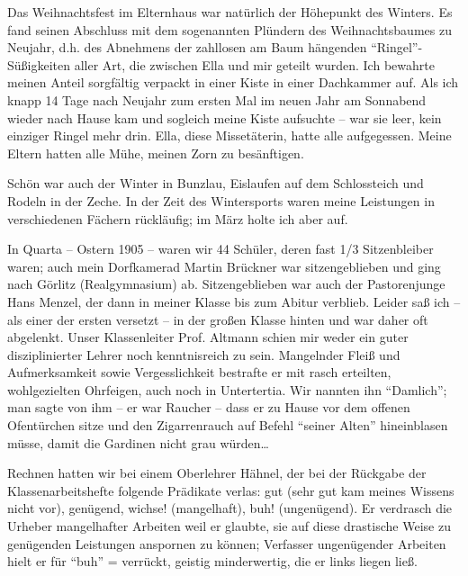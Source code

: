 \documentclass[a5paper,pagesize,10pt,twoside=true]{scrbook}
\renewcommand{\marginpar}[2][]{}
\begin{document}
Das Weihnachtsfest im Elternhaus war natürlich der Höhepunkt des Winters. Es fand seinen Abschluss mit dem sogenannten Plündern des Weihnachtsbaumes zu Neujahr, d.h. des Abnehmens der zahllosen am Baum hängenden \enquote{Ringel}-Süßigkeiten aller Art, die zwischen Ella und mir geteilt wurden. Ich bewahrte meinen Anteil sorgfältig verpackt in einer Kiste in einer Dachkammer auf. Als ich knapp 14 Tage nach Neujahr zum ersten Mal im neuen Jahr am Sonnabend wieder nach Hause kam und sogleich meine Kiste aufsuchte -- war sie leer, kein einziger Ringel mehr drin. Ella, diese Missetäterin, hatte alle aufgegessen. Meine Eltern hatten alle Mühe, meinen Zorn zu besänftigen.

Schön war auch der Winter in Bunzlau, Eislaufen auf dem Schlossteich und Rodeln in der Zeche. In der Zeit des Wintersports waren meine Leistungen in verschiedenen Fächern rückläufig; im März holte ich aber auf.

In Quarta -- Ostern 1905 -- waren wir 44 Schüler, deren fast 1/3 Sitzenbleiber waren; auch mein Dorfkamerad Martin Brückner war sitzengeblieben und ging nach Görlitz (Realgymnasium) ab. Sitzengeblieben war auch der Pastorenjunge Hans Menzel, der dann in meiner Klasse bis zum Abitur verblieb. Leider saß ich -- als einer der ersten versetzt -- in der großen Klasse hinten und war daher oft abgelenkt. Unser Klassenleiter Prof. Altmann schien mir weder ein guter disziplinierter Lehrer noch kenntnisreich zu sein. Mangelnder Fleiß und Aufmerksamkeit sowie Vergesslichkeit bestrafte er mit rasch erteilten, wohlgezielten Ohrfeigen, auch noch in Untertertia. \marginpar{47} Wir nannten ihn \enquote{Damlich}; man sagte von ihm -- er war Raucher -- dass er zu Hause vor dem offenen Ofentürchen sitze und den Zigarrenrauch auf Befehl \enquote{seiner Alten} hineinblasen müsse, damit die Gardinen nicht grau würden\dots

Rechnen hatten wir bei einem Oberlehrer Hähnel, der bei der Rückgabe der Klassenarbeitshefte folgende Prädikate verlas: gut (sehr gut kam meines Wissens nicht vor), genügend, wichse! (mangelhaft), buh! (ungenügend). Er verdrasch die Urheber mangelhafter Arbeiten weil er glaubte, sie auf diese drastische Weise zu genügenden Leistungen anspornen zu können; Verfasser ungenügender Arbeiten hielt er für \enquote{buh} = verrückt, geistig minderwertig, die er links liegen ließ.
\end{document}
